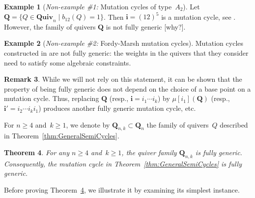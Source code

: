 \documentclass[11pt, letterpaper]{amsart}
\newtheorem{theorem}{Theorem}[section]
\theoremstyle{definition}
\newtheorem{remark}[theorem]{Remark}
\newtheorem{example}[theorem]{Example}
\numberwithin{equation}{section}
\def\Quiv {{\mathbf{Quiv}}}
\begin{document}
\pagebreak[3]

\begin{example}[\emph{Non-example \#1:} Mutation cycles of type~$A_2$]
\label{eg:A2-nongeneric-cycle}
Let $\mathbf{Q}=\{Q\in\Quiv_n\mid b_{12}(Q)=1\}$.
Then $\mathbf{i}=(12)^5$ is a mutation cycle, see \cite{FWZ, ca2}. 
However, the family of quivers $\mathbf{Q}$ is not fully generic [why?]. 
\end{example}

\begin{example}[\emph{Non-example \#2:} Fordy-Marsh mutation cycles]
\label{eg:fordy-marsh-nongeneric-cycle}
Mutation cycles constructed in \cite{Fordy-Marsh} are not fully generic:
the weights in the quivers that they consider need to satisfy some algebraic constraints. 
\end{example}

\begin{remark}
While we will not rely on this statement, it can be shown that the property of being fully generic does not depend 
on the choice of a base point on a mutation cycle. 
Thus, replacing $\mathbf{Q}$ (resp., $\mathbf{i}=i_1\cdots i_k$) 
by $\mu[i_1](\mathbf{Q})$ (resp., $\mathbf{i}'=i_2\cdots i_k i_1$)
produces another fully generic mutation cycle, etc. 
\end{remark}



For $n\ge 4$ and~$k\ge 1$, 
we denote by $\mathbf{Q}_{n,k}\subset\mathbf{Q}_n$ the family of quivers~$Q$ described in Theorem~\ref{thm:GeneralSemiCycles}. 

\begin{theorem}
\label{th:long-cycle-generic}
For any $n\ge 4$ and~$k\ge 1$, 
the quiver family $\mathbf{Q}_{n,k}$ is fully generic. %
Consequently, the mutation cycle in Theorem~\ref{thm:GeneralSemiCycles} is fully generic. 
\end{theorem}

Before proving Theorem~\ref{th:long-cycle-generic}, we illustrate it by examining its simplest instance.  
\end{document}
